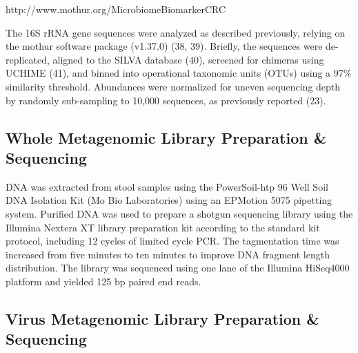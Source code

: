 \documentclass[12pt,]{article}
\begin{document}
http://www.mothur.org/MicrobiomeBiomarkerCRC

The 16S rRNA gene sequences were analyzed as described previously,
relying on the mothur software package (v1.37.0) (38, 39). Briefly, the
sequences were de-replicated, aligned to the SILVA database (40),
screened for chimeras using UCHIME (41), and binned into operational
taxonomic units (OTUs) using a 97\% similarity threshold. Abundances
were normalized for uneven sequencing depth by randomly sub-sampling to
10,000 sequences, as previously reported (23).

\subsection{Whole Metagenomic Library Preparation \&
Sequencing}\label{whole-metagenomic-library-preparation-sequencing}

DNA was extracted from stool samples using the PowerSoil-htp 96 Well
Soil DNA Isolation Kit (Mo Bio Laboratories) using an EPMotion 5075
pipetting system. Purified DNA was used to prepare a shotgun sequencing
library using the Illumina Nextera XT library preparation kit according
to the standard kit protocol, including 12 cycles of limited cycle PCR.
The tagmentation time was increased from five minutes to ten minutes to
improve DNA fragment length distribution. The library was sequenced
using one lane of the Illumina HiSeq4000 platform and yielded 125 bp
paired end reads.

\subsection{Virus Metagenomic Library Preparation \&
Sequencing}\label{virus-metagenomic-library-preparation-sequencing}
\end{document}
